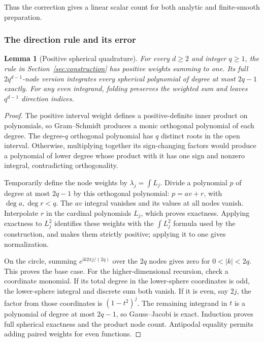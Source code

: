\documentclass[11pt,letterpaper]{article}
\newcommand{\ii}{\mathrm i}
\newtheorem{lemma}{Lemma}[section]
\theoremstyle{definition}
\theoremstyle{remark}
\begin{document}
Thus the correction gives a linear scalar count for both analytic and
finite-smooth preparation.

\subsubsection{The direction rule and its error}
\begin{lemma}[Positive spherical quadrature]\label{thm:directions}
For every \(d\ge2\) and integer \(q\ge1\), the rule in Section~\ref{sec:construction} has positive
weights summing to one. Its full \(2q^{d-1}\)-node version integrates every
spherical polynomial of degree at most \(2q-1\) exactly.
For any even integrand, folding preserves the weighted sum and leaves
\(q^{d-1}\) direction indices.
\end{lemma}
\begin{proof}
The positive interval weight defines a positive-definite inner product on
polynomials, so Gram--Schmidt produces a monic orthogonal polynomial of each
degree. The degree-\(q\) orthogonal polynomial has
\(q\) distinct roots in the open interval. Otherwise, multiplying together
its sign-changing factors would produce a polynomial of lower degree whose
product with it has one sign and nonzero integral, contradicting orthogonality.

Temporarily define the node weights by \(\lambda_j=\int L_j\).
Divide a polynomial \(p\) of degree at most \(2q-1\) by this orthogonal
polynomial: \(p=av+r\), with \(\deg a,\deg r<q\).
The \(av\) integral vanishes and its values at all nodes vanish. Interpolate
\(r\) in the cardinal polynomials \(L_j\), which proves exactness.
Applying exactness to \(L_j^2\) identifies these weights with the
\(\int L_j^2\) formula used by the construction, and makes them strictly
positive; applying it to one gives normalization.

On the circle, summing \(e^{\ii k2\pi j/(2q)}\) over the \(2q\) nodes gives
zero for \(0<|k|<2q\). This proves the base case.
For the higher-dimensional recursion, check a coordinate monomial.
If its total degree in the lower-sphere coordinates is odd, the lower-sphere
integral and discrete sum both vanish. If it is even, say \(2j\), the factor
from those coordinates is \((1-t^2)^j\). The remaining integrand in \(t\)
is a polynomial of degree at most \(2q-1\), so Gauss--Jacobi is exact.
Induction proves full spherical exactness and the product node count.
Antipodal equality permits adding paired weights for even functions.
\end{proof}
\end{document}
